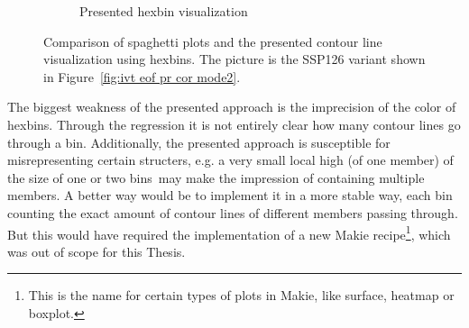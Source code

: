 \begin{figure}[!htb]
\begin{subfigure}[b]{0.49\textwidth}
    \caption{Presented hexbin visualization}
    \label{fig:comparsion member vis hexbin}
  \end{subfigure}
  \caption{Comparison of spaghetti plots and the presented contour line visualization using hexbins. The picture is the SSP126 variant shown in Figure~\ref{fig:ivt eof pr cor mode2}.}
    \label{fig:comparsion member vis}
\end{figure}


The biggest weakness of the presented approach is the imprecision of the color of hexbins. 
Through the regression it is not entirely clear how many contour lines go through a bin. 
Additionally, the presented approach is susceptible for misrepresenting certain structers, e.g. a very small local high (of one member) of the size of one or two bins may make the impression of containing multiple members. 
A better way would be to implement it in a more stable way, each bin counting the exact amount of contour lines of different members passing through. 
But this would have required the implementation of a new Makie recipe\footnote{This is the name for certain types of plots in Makie, like surface, heatmap or boxplot.}, which was out of scope for this Thesis. 

%

